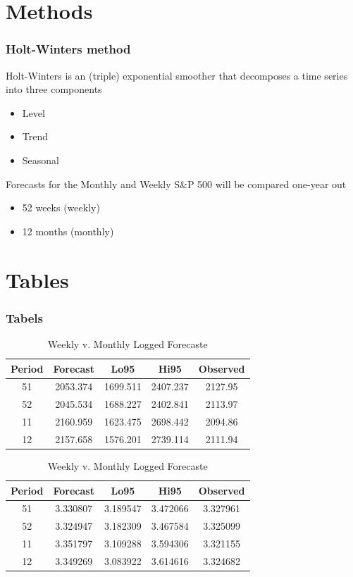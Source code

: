 \documentclass{beamer}
\begin{document}
\section{Methods}
\begin{frame}
	\frametitle{Holt-Winters method}
Holt-Winters is an (triple) exponential smoother that decomposes a time series into three components
		\begin{itemize}
			\item Level
			\item Trend
			\item Seasonal
		\end{itemize}
Forecasts for the Monthly and Weekly S\&P 500 will be compared one-year out
		\begin{itemize}
			\item 52 weeks (weekly)
			\item 12 months (monthly)
		\end{itemize}
\end{frame}

\section{Tables}
\begin{frame}
	\frametitle{Tabels}
\begin{table}[H]
\center
\begin{tabular}{c c c c c}
\hline
Period & Forecast & Lo95 & Hi95 & Observed \\
\hline
51 & 2053.374 & 1699.511 & 2407.237 & 2127.95   \\
52 & 2045.534 & 1688.227 & 2402.841 & 2113.97  \\
\hline
11 & 2160.959 & 1623.475 & 2698.442 & 2094.86  \\
12 & 2157.658 & 1576.201 & 2739.114 & 2111.94  \\
\hline
\end{tabular}
\caption{Weekly v. Monthly Raw Forecaste}
\begin{tabular}{c c c c c}
\hline
Period & Forecast & Lo95 & Hi95 & Observed \\
\hline
51 & 3.330807 & 3.189547 & 3.472066 & 3.327961  \\
52 & 3.324947 & 3.182309 & 3.467584 & 3.325099  \\
\hline
11 & 3.351797 & 3.109288 & 3.594306 & 3.321155  \\
12 & 3.349269 & 3.083922 & 3.614616 & 3.324682  \\
\hline
\end{tabular}
\caption{Weekly v. Monthly Logged Forecaste}
\end{table}
\end{frame}
\end{document}
